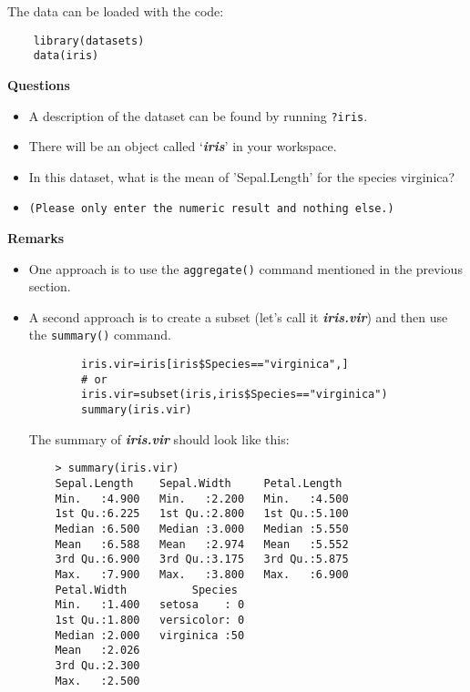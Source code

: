 \documentclass[]{article}
\begin{document}
The data can be loaded with the code:
\begin{framed}
	\begin{verbatim}
	library(datasets)
	data(iris)
	\end{verbatim}
\end{framed}
\noindent \textbf{Questions}
\begin{itemize}
	\item A description of the dataset can be found by running \texttt{?iris}.
	\item 
	There will be an object called `\textit{\textbf{iris}}' in your workspace. 
	\item In this dataset, what is the mean of 'Sepal.Length' for the species virginica?
	\item \texttt{(Please only enter the numeric result and nothing else.)}
\end{itemize}
\newpage
\textbf{Remarks}
\begin{itemize}
	\item One approach is to use the \texttt{aggregate()} command mentioned in the previous section.
	\item A second approach is to create a subset (let's call it \textit{\textbf{iris.vir}}) and then use the \texttt{summary()} command.
	\begin{framed}
		\begin{verbatim}
		iris.vir=iris[iris$Species=="virginica",]
		# or
		iris.vir=subset(iris,iris$Species=="virginica")
		summary(iris.vir)
		\end{verbatim}
	\end{framed}
	
	The summary of \textit{\textbf{iris.vir}} should look like this:
	\begin{verbatim}
	> summary(iris.vir)
	Sepal.Length    Sepal.Width     Petal.Length  
	Min.   :4.900   Min.   :2.200   Min.   :4.500  
	1st Qu.:6.225   1st Qu.:2.800   1st Qu.:5.100  
	Median :6.500   Median :3.000   Median :5.550  
	Mean   :6.588   Mean   :2.974   Mean   :5.552  
	3rd Qu.:6.900   3rd Qu.:3.175   3rd Qu.:5.875  
	Max.   :7.900   Max.   :3.800   Max.   :6.900  
	Petal.Width          Species  
	Min.   :1.400   setosa    : 0  
	1st Qu.:1.800   versicolor: 0  
	Median :2.000   virginica :50  
	Mean   :2.026                  
	3rd Qu.:2.300                  
	Max.   :2.500                  
	\end{verbatim}
\end{itemize}

\newpage
\end{document}
